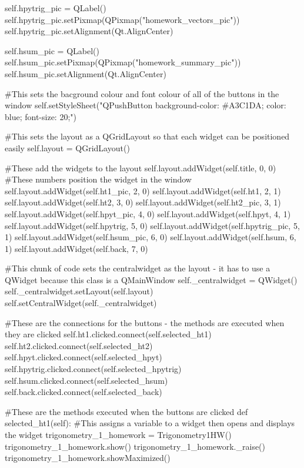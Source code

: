 \begin{landscape}
\begin{python}
        self.hpytrig_pic = QLabel()
        self.hpytrig_pic.setPixmap(QPixmap("homework_vectors_pic"))
        self.hpytrig_pic.setAlignment(Qt.AlignCenter)
        
        self.hsum_pic = QLabel()
        self.hsum_pic.setPixmap(QPixmap("homework_summary_pic"))
        self.hsum_pic.setAlignment(Qt.AlignCenter)

        #This sets the bacground colour and font colour of all of the buttons in the window
        self.setStyleSheet("QPushButton {background-color: #A3C1DA; color: blue; font-size: 20;}")

        #This sets the layout as a QGridLayout so that each widget can be positioned easily
        self.layout = QGridLayout()

        #These add the widgets to the layout
        self.layout.addWidget(self.title, 0, 0) #These numbers position the widget in the window
        self.layout.addWidget(self.ht1_pic, 2, 0)
        self.layout.addWidget(self.ht1, 2, 1)
        self.layout.addWidget(self.ht2, 3, 0)
        self.layout.addWidget(self.ht2_pic, 3, 1)
        self.layout.addWidget(self.hpyt_pic, 4, 0)
        self.layout.addWidget(self.hpyt, 4, 1)
        self.layout.addWidget(self.hpytrig, 5, 0)
        self.layout.addWidget(self.hpytrig_pic, 5, 1)
        self.layout.addWidget(self.hsum_pic, 6, 0)
        self.layout.addWidget(self.hsum, 6, 1)
        self.layout.addWidget(self.back, 7, 0)

        #This chunk of code sets the centralwidget as the layout - it has to use a QWidget because this class is a QMainWindow
        self._centralwidget = QWidget()
        self._centralwidget.setLayout(self.layout)
        self.setCentralWidget(self._centralwidget)

        #These are the connections for the buttons - the methods are executed when they are clicked
        self.ht1.clicked.connect(self.selected_ht1)
        self.ht2.clicked.connect(self.selected_ht2)
        self.hpyt.clicked.connect(self.selected_hpyt)
        self.hpytrig.clicked.connect(self.selected_hpytrig)
        self.hsum.clicked.connect(self.selected_hsum)
        self.back.clicked.connect(self.selected_back)

    #These are the methods executed when the buttons are clicked
    def selected_ht1(self):
        #This assigns a variable to a widget then opens and displays the widget
        trigonometry_1_homework = Trigonometry1HW()
        trigonometry_1_homework.show()
        trigonometry_1_homework._raise()
        trigonometry_1_homework.showMaximized()


\end{python}
\end{landscape}
